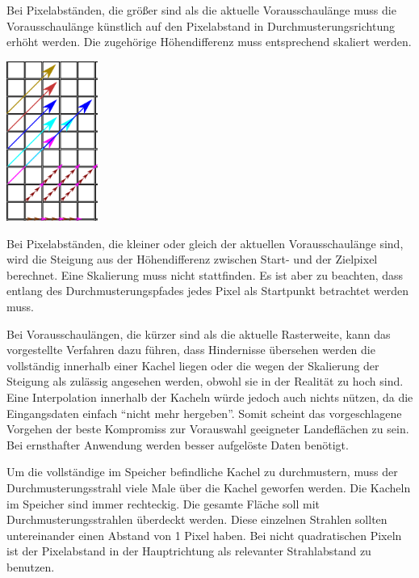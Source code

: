 \documentclass[
11pt, %
a4paper, %
oneside, %
pdfspacing, %
headinclude,
BCOR5mm, %
ngerman, %
bibtotocnumbered,
]{scrartcl}
\begin{document}
	Bei Pixelabständen, die größer sind als die aktuelle Vorausschaulänge muss die Vorausschaulänge künstlich auf den Pixelabstand in Durchmusterungsrichtung erhöht werden. Die zugehörige Höhendifferenz muss entsprechend skaliert werden. 
	
	 	\begin{minipage}{\textwidth}
		\skippingparagraph
		
		\begin{minipage}[t]{3cm}
			\vspace{0pt}
			\centering
			\includegraphics[width=3cm]{./drawings/Vorausschaulaengen.png}
		\end{minipage}
			\begin{minipage}[t]{\textwidth-3cm}
				\vspace{0pt}
				Bei Pixelabständen, die kleiner oder gleich der aktuellen Vorausschaulänge sind, wird die Steigung aus der Höhendifferenz zwischen Start- und der Zielpixel berechnet. Eine Skalierung muss nicht stattfinden. Es ist aber zu beachten, dass entlang des Durchmusterungspfades jedes Pixel als Startpunkt betrachtet werden muss.			
		\end{minipage}\skippingparagraph
	\end{minipage}

	Bei Vorausschaulängen, die kürzer sind als die aktuelle Rasterweite, kann das vorgestellte Verfahren dazu führen, dass Hindernisse übersehen werden die vollständig innerhalb einer Kachel liegen oder die wegen der Skalierung der Steigung als zulässig angesehen werden, obwohl sie in der Realität zu hoch sind. Eine Interpolation innerhalb der Kacheln würde jedoch auch nichts nützen, da die Eingangsdaten einfach "`nicht mehr hergeben"'. Somit scheint das vorgeschlagene Vorgehen der beste Kompromiss zur Vorauswahl geeigneter Landeflächen zu sein. Bei ernsthafter Anwendung werden besser aufgelöste Daten benötigt.
	
	\skippingparagraph
	
	Um die vollständige im Speicher befindliche Kachel zu durchmustern, muss der Durchmusterungsstrahl viele Male über die Kachel geworfen werden. Die Kacheln im Speicher sind immer rechteckig. Die gesamte Fläche soll mit Durchmusterungsstrahlen überdeckt werden. Diese einzelnen Strahlen sollten untereinander einen Abstand von 1 Pixel haben. Bei nicht quadratischen Pixeln ist der Pixelabstand in der Hauptrichtung als relevanter Strahlabstand zu benutzen.
	
\end{document}
